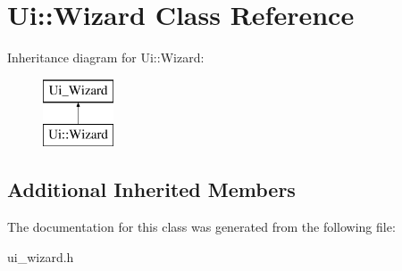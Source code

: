 \hypertarget{class_ui_1_1_wizard}{}\section{Ui\+:\+:Wizard Class Reference}
\label{class_ui_1_1_wizard}
Inheritance diagram for Ui\+:\+:Wizard\+:\begin{figure}[H]
\begin{center}
\leavevmode
\includegraphics[height=2.000000cm]{class_ui_1_1_wizard}
\end{center}
\end{figure}
\subsection*{Additional Inherited Members}


The documentation for this class was generated from the following file\+:\begin{DoxyCompactItemize}
\item 
ui\+\_\+wizard.\+h\end{DoxyCompactItemize}
